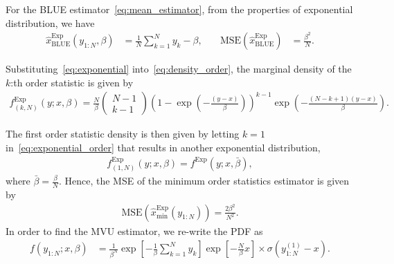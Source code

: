 \documentclass{article}
\newcommand{\MSE}{\mathrm{MSE}}
\begin{document}
For the BLUE estimator~\eqref{eq:mean_estimator}, from the properties of exponential distribution, we have
%
%
\begin{align}
\hat{x}_{\mathrm{BLUE}}^{\mathrm{Exp}}(y_{1:N},\beta) &= \frac{1}{N}\sum_{k=1}^{N}y_k - \beta,
&\quad 
\MSE(\hat{x}_{\mathrm{BLUE}}^{\mathrm{Exp}}) &= \frac{\beta^2}{N}.
\end{align}
%
%

Substituting~\eqref{eq:exponential} into~\eqref{eq:density_order}, the marginal density of the $k$:th order statistic is given by
%
%
\begin{align}
f^{\mathrm{Exp}}_{(k,N)}(y;x,\beta) = \frac{N}{\beta}\begin{pmatrix}N-1\\k-1\end{pmatrix}\left(1-\exp(-\frac{(y-x)}{\beta})\right)^{k-1}\exp\left(-\frac{(N-k+1)(y-x)}{\beta}\right).
\label{eq:exponential_order}
\end{align}
%
%

The first order statistic density is then given by letting $k=1$ in~\eqref{eq:exponential_order} that results in another exponential distribution,
%
%
\begin{align}
f^{\mathrm{Exp}}_{(1,N)}(y;x,\beta) = f^{\mathrm{Exp}}(y;x,\bar{\beta}),
\end{align}
%
%
where $\bar{\beta}=\frac{\beta}{N}$. Hence, the MSE of the minimum order statistics estimator is given by
%
%
\begin{align}
\MSE\left(\hat{x}_{\mathrm{min}}^{\mathrm{Exp}}(y_{1:N})\right) = \frac{2\beta^2}{N^2}.
\end{align}
%
%
In order to find the MVU estimator, we re-write the PDF as
%
%
\begin{align}
f(y_{1:N};x,\beta) &= \frac{1}{\beta^N}\exp\left[-\frac{1}{\beta}\sum_{k=1}^{N}y_k\right]\exp\left[-\frac{N}{\beta}x\right]\times\sigma(y^{(1)}_{1:N} - x).
\label{eq:exponential_pdf_2}
\end{align}
%
%
\end{document}
